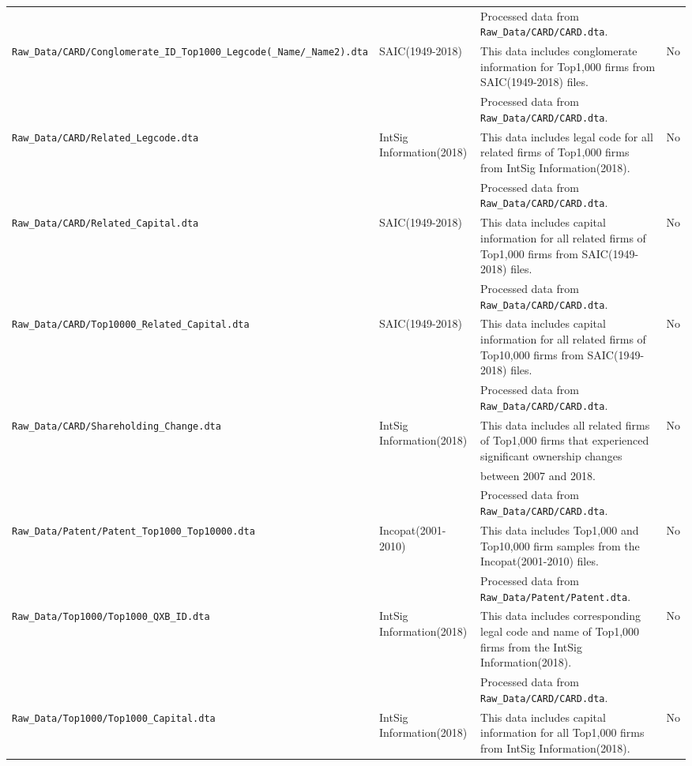 \documentclass[12pt,notitlepage]{article}
\begin{document}
\begin{landscape}
\begin{table}[htbp]
{\begin{tabular}{llll}
		&& Processed data from \texttt{Raw\_Data/CARD/CARD.dta}. \\		
\texttt{Raw\_Data/CARD/Conglomerate\_ID\_Top1000\_Legcode(\_Name/\_Name2).dta} & SAIC(1949-2018) & This data includes conglomerate information for Top1,000 firms from SAIC(1949-2018) files. & No \\
		&& Processed data from \texttt{Raw\_Data/CARD/CARD.dta}. \\	
\texttt{Raw\_Data/CARD/Related\_Legcode.dta} & IntSig Information(2018) & This data includes legal code for all related firms of Top1,000 firms from IntSig Information(2018). & No \\
		&& Processed data from \texttt{Raw\_Data/CARD/CARD.dta}. \\	
\texttt{Raw\_Data/CARD/Related\_Capital.dta} & SAIC(1949-2018) & This data includes capital information for all related firms of Top1,000 firms from SAIC(1949-2018) files. & No \\
		&& Processed data from \texttt{Raw\_Data/CARD/CARD.dta}. \\
\texttt{Raw\_Data/CARD/Top10000\_Related\_Capital.dta} & SAIC(1949-2018) & This data includes capital information for all related firms of Top10,000 firms from SAIC(1949-2018) files. & No \\
		&& Processed data from \texttt{Raw\_Data/CARD/CARD.dta}. \\
\texttt{Raw\_Data/CARD/Shareholding\_Change.dta} & IntSig Information(2018) & This data includes all related firms of Top1,000 firms that experienced significant ownership changes  & No \\
		&& between 2007 and 2018. \\
		&& Processed data from \texttt{Raw\_Data/CARD/CARD.dta}. \\	
\texttt{Raw\_Data/Patent/Patent\_Top1000\_Top10000.dta} & Incopat(2001-2010) & This data includes Top1,000 and Top10,000 firm samples from the Incopat(2001-2010) files. & No \\
		&& Processed data from \texttt{Raw\_Data/Patent/Patent.dta}. \\	
\texttt{Raw\_Data/Top1000/Top1000\_QXB\_ID.dta} & IntSig Information(2018) & This data includes corresponding legal code and name of Top1,000 firms from the IntSig Information(2018). & No \\
		&& Processed data from \texttt{Raw\_Data/CARD/CARD.dta}. \\
\texttt{Raw\_Data/Top1000/Top1000\_Capital.dta} & IntSig Information(2018) & This data includes capital information for all Top1,000 firms from IntSig Information(2018). & No \\

\end{tabular}}
\end{table}
\end{landscape}
\end{document}
